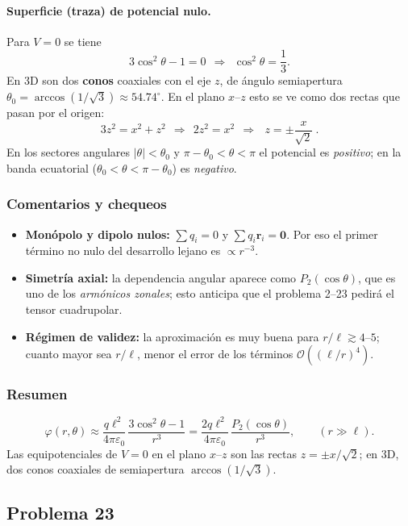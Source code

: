 \documentclass{article}
\begin{document}
\paragraph{Superficie (traza) de potencial nulo.}
Para $V=0$ se tiene
\[
3\cos^{2}\theta-1=0\ \ \Longrightarrow\ \ \cos^{2}\theta=\frac{1}{3}.
\]
En 3D son dos \textbf{conos} coaxiales con el eje $z$, de ángulo semiapertura $\theta_{0}=\arccos(1/\sqrt{3})\approx 54.74^\circ$.  
En el plano $x$–$z$ esto se ve como dos rectas que pasan por el origen:
\[
3z^{2}=x^{2}+z^{2}\ \ \Longrightarrow\ \ 2z^{2}=x^{2}\ \ \Longrightarrow\ \
\boxed{\ z=\pm \frac{x}{\sqrt{2}}\ }.
\]
En los sectores angulares $|\theta|<\theta_{0}$ y $\pi-\theta_{0}<\theta<\pi$ el potencial es \emph{positivo}; en la banda ecuatorial ($\theta_{0}<\theta<\pi-\theta_{0}$) es \emph{negativo}.

\subsubsection*{Comentarios y chequeos}
\begin{itemize}
\item \textbf{Monópolo y dipolo nulos:} $\sum q_i=0$ y $\sum q_i\mathbf r_i=\mathbf 0$. Por eso el primer término no nulo del desarrollo lejano es $\propto r^{-3}$.
\item \textbf{Simetría axial:} la dependencia angular aparece como $P_2(\cos\theta)$, que es uno de los \emph{armónicos zonales}; esto anticipa que el problema 2–23 pedirá el tensor cuadrupolar.
\item \textbf{Régimen de validez:} la aproximación es muy buena para $r/\ell\gtrsim 4$–$5$; cuanto mayor sea $r/\ell$, menor el error de los términos $\mathcal O((\ell/r)^{4})$.
\end{itemize}

\subsubsection*{Resumen}
\[
\boxed{\ \varphi(r,\theta)\approx \frac{q\ell^{2}}{4\pi\varepsilon_0}\,\frac{3\cos^{2}\theta-1}{r^{3}}
=\frac{2q\ell^{2}}{4\pi\varepsilon_0}\,\frac{P_2(\cos\theta)}{r^{3}},\qquad (r\gg \ell). \ }
\]
Las equipotenciales de $V=0$ en el plano $x$–$z$ son las rectas $z=\pm x/\sqrt{2}$; en 3D, dos conos coaxiales de semiapertura $\arccos(1/\sqrt{3})$.


\subsection{Problema 23} \vspace{0.5cm}
\end{document}
